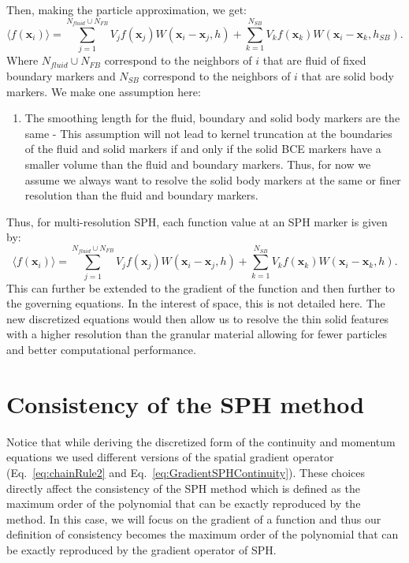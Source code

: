 \documentclass{article}
\newcommand{\vx}{\mathbf{x}}
\begin{document}
Then, making the particle approximation, we get:
\begin{equation}
    \label{eq:multiResolutionSPHParticles}
    \langle f(\vx_i) \rangle = \sum_{j=1}^{N_{fluid} \cup N_{FB}} V_j f(\vx_j) W(\vx_i - \vx_j, h) + \sum_{k=1}^{N_{SB}} V_k f(\vx_k) W(\vx_i - \vx_k, h_{SB}).
\end{equation}
Where $N_{fluid} \cup N_{FB}$ correspond to the neighbors of $i$ that are fluid of fixed boundary markers and $N_{SB}$ correspond to the neighbors of $i$ that are solid body markers. We make one assumption here:
\begin{enumerate}
    \item The smoothing length for the fluid, boundary and solid body markers are the same - This assumption will not lead to kernel truncation at the boundaries of the fluid and solid markers if and only if the solid BCE markers have a smaller volume than the fluid and boundary markers. Thus, for now we assume we always want to resolve the solid body markers at the same or finer resolution than the fluid and boundary markers.
\end{enumerate}
Thus, for multi-resolution SPH, each function value at an SPH marker is given by:
\begin{equation}
    \label{eq:multiResolutionSPHMarker}
    \langle f(\vx_i) \rangle = \sum_{j=1}^{N_{fluid} \cup N_{FB}} V_j f(\vx_j) W(\vx_i - \vx_j, h) + \sum_{k=1}^{N_{SB}} V_k f(\vx_k) W(\vx_i - \vx_k, h).
\end{equation}
This can further be extended to the gradient of the function and then further to the governing equations. In the interest of space, this is not detailed here. The new discretized equations would then allow us to resolve the thin solid features with a higher resolution than the granular material allowing for fewer particles and better computational performance.
\section{Consistency of the SPH method}
\label{sec:consistency}
Notice that while deriving the discretized form of the continuity and momentum equations we used different versions of the spatial gradient operator (Eq.~\ref{eq:chainRule2} and Eq.~\ref{eq:GradientSPHContinuity}). These choices directly affect the consistency of the SPH method which is defined as the maximum order of the polynomial that can be exactly reproduced by the method. In this case, we will focus on the gradient of a function and thus our definition of consistency becomes the maximum order of the polynomial that can be exactly reproduced by the gradient operator of SPH.
\end{document}
